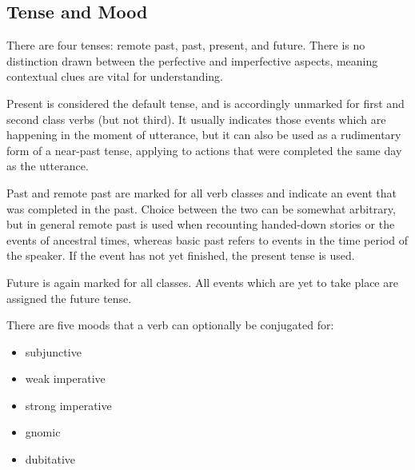 \subsection{Tense and Mood}

There are four tenses: remote past, past, present, and future. There is no
distinction drawn between the perfective and imperfective aspects, meaning
contextual clues are vital for understanding.

Present is considered the default tense, and is accordingly unmarked for first
and second class verbs (but not third). It usually indicates those events which
are happening in the moment of utterance, but it can also be used as a
rudimentary form of a near-past tense, applying to actions that were completed
the same day as the utterance.

Past and remote past are marked for all verb classes and indicate an event that
was completed in the past. Choice between the two can be somewhat arbitrary, but
in general remote past is used when recounting handed-down stories or the events
of ancestral times, whereas basic past refers to events in the time period of
the speaker. If the event has not yet finished, the present tense is used.

Future is again marked for all classes. All events which are yet to take place
are assigned the future tense.

There are five moods that a verb can optionally be conjugated for:

\begin{itemize}
\item subjunctive
\item weak imperative
\item strong imperative
\item gnomic
\item dubitative
\end{itemize}

